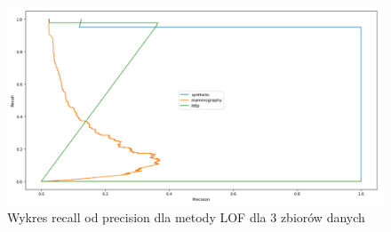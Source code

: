 \documentclass{classrep}
\begin{document}
{        \begin{figure}[!htbp]
            \centering
            \includegraphics[width=\textwidth]{img/recall_precision_lof.png}
            \caption
            {Wykres recall od precision dla metody LOF dla 3 zbiorów danych}
            \label{fig:lof}
        \end{figure}
        \FloatBarrier
    }
\end{document}
